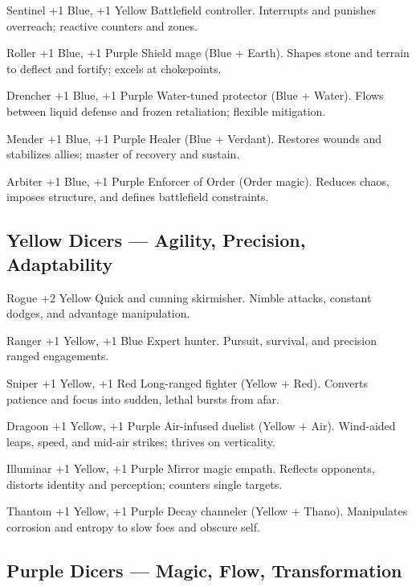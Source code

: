 \ClassCard
  {Sentinel}
  {+1 Blue, +1 Yellow}
  {Battlefield controller.}
  {Interrupts and punishes overreach; reactive counters and zones.}

\ClassCard
  {Roller}
  {+1 Blue, +1 Purple}
  {Shield mage (Blue + Earth).}
  {Shapes stone and terrain to deflect and fortify; excels at chokepoints.}

\ClassCard
  {Drencher}
  {+1 Blue, +1 Purple}
  {Water-tuned protector (Blue + Water).}
  {Flows between liquid defense and frozen retaliation; flexible mitigation.}

\ClassCard
  {Mender}
  {+1 Blue, +1 Purple}
  {Healer (Blue + Verdant).}
  {Restores wounds and stabilizes allies; master of recovery and sustain.}

\ClassCard
  {Arbiter}
  {+1 Blue, +1 Purple}
  {Enforcer of Order (Order magic).}
  {Reduces chaos, imposes structure, and defines battlefield constraints.}

\clearpage

\subsection*{Yellow Dicers — Agility, Precision, Adaptability}

\ClassCard
  {Rogue}
  {+2 Yellow}
  {Quick and cunning skirmisher.}
  {Nimble attacks, constant dodges, and advantage manipulation.}

\ClassCard
  {Ranger}
  {+1 Yellow, +1 Blue}
  {Expert hunter.}
  {Pursuit, survival, and precision ranged engagements.}

\ClassCard
  {Sniper}
  {+1 Yellow, +1 Red}
  {Long-ranged fighter (Yellow + Red).}
  {Converts patience and focus into sudden, lethal bursts from afar.}

\ClassCard
  {Dragoon}
  {+1 Yellow, +1 Purple}
  {Air-infused duelist (Yellow + Air).}
  {Wind-aided leaps, speed, and mid-air strikes; thrives on verticality.}

\ClassCard
  {Illuminar}
  {+1 Yellow, +1 Purple}
  {Mirror magic empath.}
  {Reflects opponents, distorts identity and perception; counters single targets.}

\ClassCard
  {Thantom}
  {+1 Yellow, +1 Purple}
  {Decay channeler (Yellow + Thano).}
  {Manipulates corrosion and entropy to slow foes and obscure self.}

\clearpage

\subsection*{Purple Dicers — Magic, Flow, Transformation}

